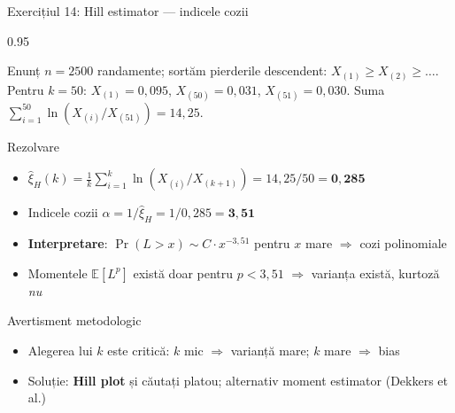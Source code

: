 \documentclass[9pt, aspectratio=169, t]{beamer}
\begin{document}
\begin{frame}[shrink=10]{Exercițiul 14: Hill estimator --- indicele cozii}
    \begin{cminipage}{0.95\textwidth}
    \begin{block}{Enunț}
    $n = 2500$ randamente; sortăm pierderile descendent: $X_{(1)} \geq X_{(2)} \geq \dots$. Pentru $k = 50$: $X_{(1)} = 0{,}095$, $X_{(50)} = 0{,}031$, $X_{(51)} = 0{,}030$. Suma $\sum_{i=1}^{50}\ln(X_{(i)}/X_{(51)}) = 14{,}25$.
    \end{block}
    \begin{exampleblock}{Rezolvare}
    \begin{itemize}\setlength{\itemsep}{0pt}
        \item $\hat{\xi}_H(k) = \frac{1}{k}\sum_{i=1}^{k}\ln(X_{(i)}/X_{(k+1)}) = 14{,}25/50 = \mathbf{0{,}285}$
        \item Indicele cozii $\alpha = 1/\hat{\xi}_H = 1/0{,}285 = \mathbf{3{,}51}$
        \item \textbf{Interpretare}: $\Pr(L > x) \sim C \cdot x^{-3{,}51}$ pentru $x$ mare $\Rightarrow$ cozi polinomiale
        \item Momentele $\mathbb{E}[L^p]$ există doar pentru $p < 3{,}51$ $\Rightarrow$ varianța există, kurtoză \emph{nu}
    \end{itemize}
    \end{exampleblock}
    \begin{alertblock}{Avertisment metodologic}
    \begin{itemize}\setlength{\itemsep}{0pt}
        \item Alegerea lui $k$ este critică: $k$ mic $\Rightarrow$ varianță mare; $k$ mare $\Rightarrow$ bias
        \item Soluție: \textbf{Hill plot} și căutați platou; alternativ moment estimator (Dekkers et al.)
    \end{itemize}
    \end{alertblock}
    \end{cminipage}
\end{frame}
\end{document}
